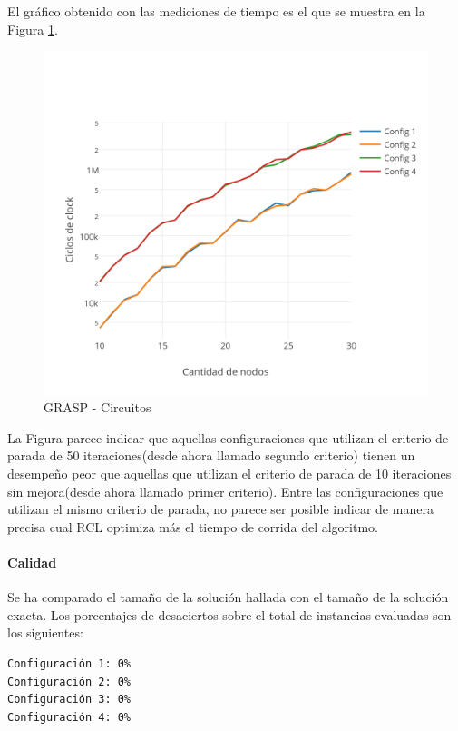 El gráfico obtenido con las mediciones de tiempo es el que se muestra en la Figura \ref{fig:4A}.

\begin{figure}[htb]
	\begin{center}
    		\includegraphics[scale=0.8]{imagenes/grasp-circuitos-tiempo.png}
	\end{center}
	\caption{GRASP - Circuitos}\label{fig:4A}
\end{figure}

La Figura parece indicar que aquellas configuraciones que utilizan el criterio de parada de 50 iteraciones(desde ahora llamado segundo criterio) tienen un desempeño peor que aquellas que utilizan el criterio de parada de 10 iteraciones sin mejora(desde ahora llamado primer criterio). Entre las configuraciones que utilizan el mismo criterio de parada, no parece ser posible indicar de manera precisa cual RCL optimiza más el tiempo de corrida del algoritmo.

\paragraph{Calidad} Se ha comparado el tamaño de la solución hallada con el tamaño de la solución exacta.  Los porcentajes de desaciertos sobre el total de instancias evaluadas son los siguientes:

\begin{verbatim}
Configuración 1: 0%
Configuración 2: 0%
Configuración 3: 0%
Configuración 4: 0%
\end{verbatim}

